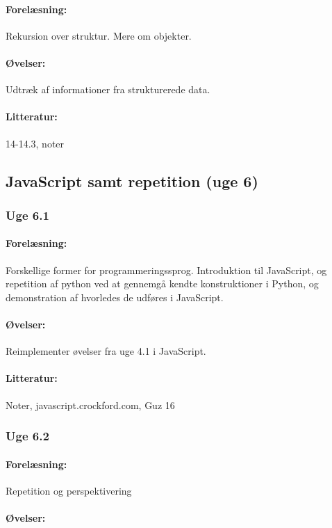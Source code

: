 \documentclass[12pt]{article}
\begin{document}
\paragraph{Forelæsning:} 
Rekursion over struktur. Mere om objekter.
\paragraph{Øvelser:}
Udtræk af informationer fra strukturerede data.
\paragraph{Litteratur:} 14-14.3, noter


\subsection{JavaScript samt repetition (uge 6)}
\subsubsection{Uge 6.1}
\paragraph{Forelæsning:} 
Forskellige former for programmeringssprog.
Introduktion til JavaScript, og repetition af python ved at gennemgå kendte konstruktioner i Python, og demonstration af hvorledes de udføres i JavaScript.
\paragraph{Øvelser:}
Reimplementer øvelser fra uge 4.1 i JavaScript.
\paragraph{Litteratur:} Noter, javascript.crockford.com, Guz 16

\subsubsection{Uge 6.2}
\paragraph{Forelæsning:} 
Repetition og perspektivering
\paragraph{Øvelser:}
\end{document}
